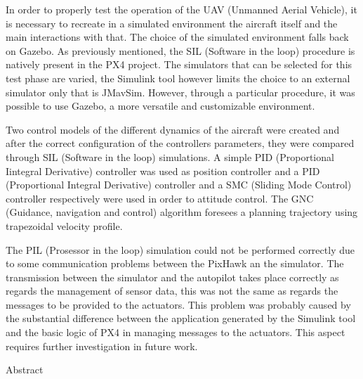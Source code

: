 \begin{commento}
In order to properly test the operation of the UAV (Unmanned Aerial Vehicle), it is necessary to recreate in a simulated environment the aircraft itself and the main interactions with that. The choice of the simulated environment falls back on Gazebo. As previously mentioned, the SIL (Software in the loop) procedure is natively present in the PX4 project. The simulators that can be selected for this test phase are varied, the Simulink tool however limits the choice to an external simulator only that is JMavSim. However, through a particular procedure, it was possible to use Gazebo, a more versatile and customizable environment.

Two control models of the different dynamics of the aircraft were created and after the correct configuration of the controllers parameters, they were compared through SIL (Software in the loop) simulations. A simple PID (Proportional Iintegral Derivative) controller was used as position controller and a PID (Proportional Integral Derivative) controller and a SMC (Sliding Mode Control) controller respectively were used in order to attitude control. The GNC (Guidance, navigation and control) algorithm foresees a planning trajectory using trapezoidal velocity profile.

The PIL (Prosessor in the loop) simulation could not be performed correctly due to some communication problems between the PixHawk an the simulator. The transmission between the simulator and the autopilot takes place correctly as regards the management of sensor data, this was not the same as regards the messages to be provided to the actuators. This problem was probably caused by the substantial difference between the application generated by the Simulink tool and the basic logic of PX4 in managing messages to the actuators. This aspect requires further investigation in future work.

Abstract


\end{commento}
